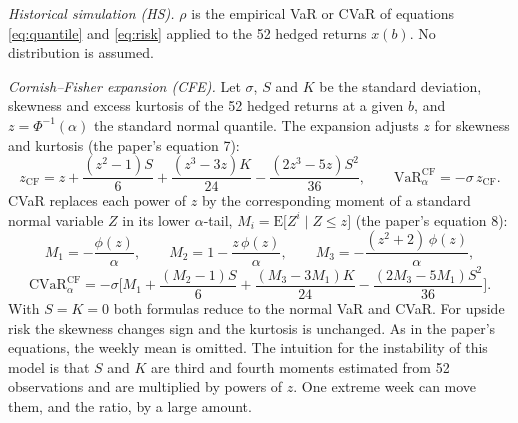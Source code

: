 \documentclass[11pt,letterpaper]{article}
\begin{document}
\textit{Historical simulation (HS).} $\rho$ is the empirical VaR or CVaR of equations \eqref{eq:quantile} and \eqref{eq:risk} applied to the 52 hedged returns $x(b)$. No distribution is assumed.

\textit{Cornish--Fisher expansion (CFE).} Let $\sigma$, $S$ and $K$ be the standard deviation, skewness and excess kurtosis of the 52 hedged returns at a given $b$, and $z = \Phi^{-1}(\alpha)$ the standard normal quantile. The expansion adjusts $z$ for skewness and kurtosis (the paper's equation 7):
\begin{equation}
z_{\mathrm{CF}} = z + \frac{(z^2-1)S}{6} + \frac{(z^3-3z)K}{24} - \frac{(2z^3-5z)S^2}{36}, \qquad \mathrm{VaR}^{\mathrm{CF}}_\alpha = -\sigma\, z_{\mathrm{CF}} .
\end{equation}
CVaR replaces each power of $z$ by the corresponding moment of a standard normal variable $Z$ in its lower $\alpha$-tail, $M_i = \mathrm{E}\big[Z^i \mid Z \le z\big]$ (the paper's equation 8):
\begin{equation}
M_1 = -\frac{\phi(z)}{\alpha}, \qquad M_2 = 1 - \frac{z\,\phi(z)}{\alpha}, \qquad M_3 = -\frac{(z^2+2)\,\phi(z)}{\alpha},
\end{equation}
\begin{equation}
\mathrm{CVaR}^{\mathrm{CF}}_\alpha = -\sigma\Big[M_1 + \frac{(M_2-1)S}{6} + \frac{(M_3-3M_1)K}{24} - \frac{(2M_3-5M_1)S^2}{36}\Big].
\end{equation}
With $S = K = 0$ both formulas reduce to the normal VaR and CVaR. For upside risk the skewness changes sign and the kurtosis is unchanged. As in the paper's equations, the weekly mean is omitted. The intuition for the instability of this model is that $S$ and $K$ are third and fourth moments estimated from 52 observations and are multiplied by powers of $z$. One extreme week can move them, and the ratio, by a large amount.
\end{document}
